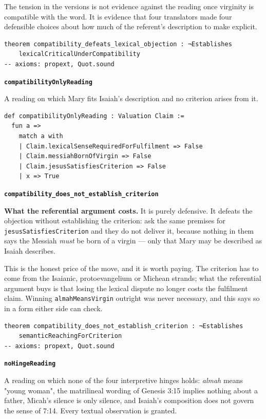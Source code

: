 \documentclass[11pt]{article}
\begin{document}
The tension in the versions is not evidence against the reading once virginity is compatible with the word. It is evidence that four translators made four defensible choices about how much of the referent's description to make explicit.

{\small\begin{verbatim}
theorem compatibility_defeats_lexical_objection : ¬Establishes
    lexicalCriticalUnderCompatibility
-- axioms: propext, Quot.sound
\end{verbatim}}
\par\medskip\noindent\textbf{\texttt{compatibility\allowbreak{}Only\allowbreak{}Reading}}\par\nobreak\noindent
A reading on which Mary fits Isaiah's description and no criterion arises from it.

{\small\begin{verbatim}
def compatibilityOnlyReading : Valuation Claim :=
  fun a =>
    match a with
    | Claim.lexicalSenseRequiredForFulfilment => False
    | Claim.messiahBornOfVirgin => False
    | Claim.jesusSatisfiesCriterion => False
    | x => True
\end{verbatim}}
\par\medskip\noindent\textbf{\texttt{compatibility\_\allowbreak{}does\_\allowbreak{}not\_\allowbreak{}establish\_\allowbreak{}criterion}}\par\nobreak\noindent
\textbf{What the referential argument costs.} It is purely defensive. It defeats the objection without establishing the criterion: ask the same premises for \texttt{jesus\allowbreak{}Satisfies\allowbreak{}Criterion} and they do not deliver it, because nothing in them says the Messiah \emph{must} be born of a virgin — only that Mary may be described as Isaiah describes.

This is the honest price of the move, and it is worth paying. The criterion has to come from the Isaianic, protoevangelium or Michean strands; what the referential argument buys is that losing the lexical dispute no longer costs the fulfilment claim. Winning \texttt{almah\allowbreak{}Means\allowbreak{}Virgin} outright was never necessary, and this says so in a form either side can check.

{\small\begin{verbatim}
theorem compatibility_does_not_establish_criterion : ¬Establishes
    semanticReachingForCriterion
-- axioms: propext, Quot.sound
\end{verbatim}}
\par\medskip\noindent\textbf{\texttt{no\allowbreak{}Hinge\allowbreak{}Reading}}\par\nobreak\noindent
A reading on which none of the four interpretive hinges holds: \emph{almah} means "young woman", the matrilineal wording of Genesis 3:15 implies nothing about a father, Micah's silence is only silence, and Isaiah's composition does not govern the sense of 7:14. Every textual observation is granted.
\end{document}
